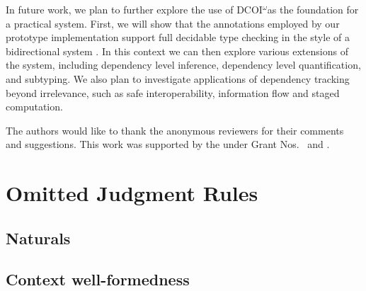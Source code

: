 \documentclass[acmsmall, screen=true, nonacm=true,
  review=\ifpublic false\else true\fi,
  anonymous=\ifanonymous true\else false\fi
]{acmart}
\makeatletter
\newcommand{\sw}[1]{}
\newcommand{\name}{\texorpdfstring{DCOI$^{\omega}$\@\xspace}{DCOI-omega}}
\makeatother
\begin{document}
In future work, we plan to further explore the use of \name as the foundation for a practical system. First, we will show that the annotations employed by our prototype implementation support full
decidable type checking in the style of a bidirectional system
\citet{dunfield-krishnaswami:bidirection,adjedj:mltt-coq}. In this context we can then explore various extensions of the system, including dependency level inference, dependency level quantification, and subtyping. We also plan to investigate applications of dependency tracking beyond irrelevance, such as safe interoperability, information flow and staged computation. \sw{Also mention inductive datatypes? Prop sort? type-directed equality? }


\begin{acks} 
The authors would like to thank the anonymous reviewers for their comments and suggestions.
This work was supported by the  under Grant Nos.~ and .
\end{acks}




\ifsubmission
\else
\appendix

\section{Omitted Judgment Rules}

\subsection{Naturals} \label{app:naturals}


\subsection{Context well-formedness} \label{app:wf}

\end{document}
